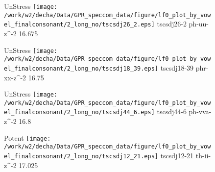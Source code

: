 \documentclass{article}
\begin{document}
\begin{figure}[t]
\begin{minipage}[b]{.24\textwidth}
UnStress
\centering
\texttt{[image: /work/w2/decha/Data/GPR\_speccom\_data/figure/lf0\_plot\_by\_vowel\_finalconsonant/2\_long\_no/tscsdj26\_2.eps]}
tscsdj26-2 ph-uu-z\textasciicircum-2 16.675
\end{minipage}
\begin{minipage}[b]{.24\textwidth}
UnStress
\centering
\texttt{[image: /work/w2/decha/Data/GPR\_speccom\_data/figure/lf0\_plot\_by\_vowel\_finalconsonant/2\_long\_no/tscsdj18\_39.eps]}
tscsdj18-39 phr-xx-z\textasciicircum-2 16.75
\end{minipage}
\begin{minipage}[b]{.24\textwidth}
UnStress
\centering
\texttt{[image: /work/w2/decha/Data/GPR\_speccom\_data/figure/lf0\_plot\_by\_vowel\_finalconsonant/2\_long\_no/tscsdj44\_6.eps]}
tscsdj44-6 ph-vva-z\textasciicircum-2 16.8
\end{minipage}
\begin{minipage}[b]{.24\textwidth}
\colorbox{Apricot}{Potent}
\centering
\texttt{[image: /work/w2/decha/Data/GPR\_speccom\_data/figure/lf0\_plot\_by\_vowel\_finalconsonant/2\_long\_no/tscsdj12\_21.eps]}
tscsdj12-21 th-ii-z\textasciicircum-2 17.025
\end{minipage}
\end{figure}
\end{document}
